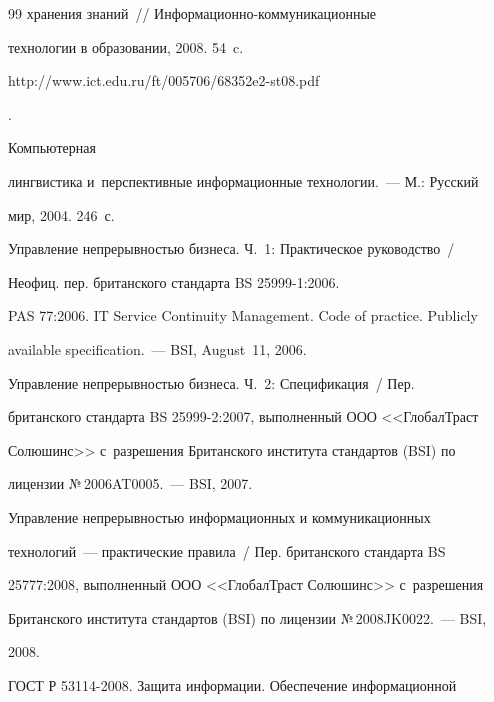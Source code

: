{{\begin{thebibliography}{99}
хранения знаний~/\!\!/ Ин\-фор\-ма\-ци\-он\-но-ком\-му\-ни\-ка\-ци\-он\-ные


технологии в образовании, 2008. 54~c. {\sf


http://www.ict.edu.ru/ft/005706/68352e2-st08.pdf}.




 Компьютерная


лингвистика и~перспективные информационные технологии.~--- М.: Русский


мир, 2004. 246~с.













Управление непрерывностью бизнеса. Ч.~1: Практическое руководство~/


Не\-офиц. пер. британского стандарта BS 25999-1:2006.




PAS 77:2006. IT Service Continuity Management. Code of practice. Publicly


available specification.~--- BSI, August~11, 2006.




Управление непрерывностью бизнеса. Ч.~2: Спецификация~/ Пер.


британского стандарта BS 25999-2:2007, выполненный ООО <<ГлобалТраст


Солюшинс>> с~разрешения Британского института стандартов (BSI) по


лицензии №\,2006AT0005.~--- BSI, 2007.







Управление непрерывностью информационных и коммуникационных


технологий~--- практические правила~/ Пер. британского стандарта BS


25777:2008, выполненный ООО <<ГлобалТраст Солюшинс>> с~разрешения


Британского института стандартов (BSI) по лицензии №\,2008JK0022.~--- BSI,


2008.




ГОСТ Р 53114-2008. Защита информации. Обеспечение информационной



\end{thebibliography}}}
